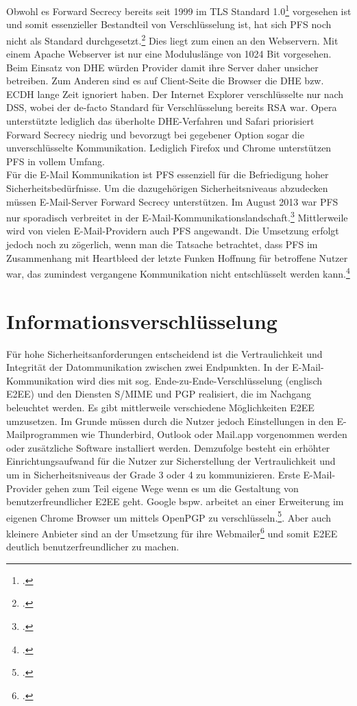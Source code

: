 \documentclass  [paper=a4,
				fontsize=12pt,
				listof=totoc,
				bibliography=totoc
				]{scrreprt}
\begin{document}
				Obwohl es Forward Secrecy bereits seit 1999 im \ac{TLS} Standard 1.0\footcite[Vgl.][]{Boeck2013} vorgesehen ist und somit essenzieller Bestandteil von Verschlüsselung ist, hat sich \ac{PFS} noch nicht als Standard durchgesetzt.\footcite{SSLLabs} Dies liegt zum einen an den Webservern. Mit einem Apache Webserver ist nur eine Moduluslänge von 1024 Bit vorgesehen. Beim Einsatz von \ac{DHE} würden Provider damit ihre Server daher unsicher betreiben. Zum Anderen sind es auf Client-Seite die Browser die \ac{DHE} bzw. \ac{ECDH} lange Zeit ignoriert haben. Der Internet Explorer verschlüsselte nur nach DSS, wobei der de-facto Standard für Verschlüsselung bereits \ac{RSA} war. Opera unterstützte lediglich das überholte \ac{DHE}-Verfahren und Safari priorisiert Forward Secrecy niedrig und bevorzugt bei gegebener Option sogar die unverschlüsselte Kommunikation. Lediglich Firefox und Chrome unterstützen \ac{PFS} in vollem Umfang.\medskip\\
				Für die E-Mail Kommunikation ist \ac{PFS} essenziell für die Befriedigung hoher Sicherheitsbedürfnisse. Um die dazugehörigen Sicherheitsniveaus abzudecken müssen E-Mail-Server Forward Secrecy unterstützen. Im August 2013 war \ac{PFS} nur sporadisch verbreitet in der E-Mail-Kommunikationslandschaft.\footcite[Vgl. ][]{Schulz2014} Mittlerweile wird von vielen E-Mail-Providern auch \ac{PFS} angewandt. Die Umsetzung erfolgt jedoch noch zu zögerlich, wenn man die Tatsache betrachtet, dass \ac{PFS} im Zusammenhang mit Heartbleed der letzte Funken Hoffnung für betroffene Nutzer war, das zumindest vergangene Kommunikation nicht entschlüsselt werden kann.\footcite[Vgl.][]{Zhu2014}
		
		\section{Informationsverschlüsselung}
			Für hohe Sicherheitsanforderungen entscheidend ist die Vertraulichkeit und Integrität der Datommunikation zwischen zwei Endpunkten. In der E-Mail-Kommunikation wird dies mit sog. Ende-zu-Ende-Verschlüsselung (englisch \ac{E2EE}) und den Diensten S/MIME und \ac{PGP} realisiert, die im Nachgang beleuchtet werden.
			Es gibt mittlerweile verschiedene Möglichkeiten \ac{E2EE} umzusetzen. Im Grunde müssen durch die Nutzer jedoch Einstellungen in den E-Mailprogrammen wie Thunderbird, Outlook oder Mail.app vorgenommen werden oder zusätzliche Software installiert werden. Demzufolge besteht ein erhöhter Einrichtungsaufwand für die Nutzer zur Sicherstellung der Vertraulichkeit und um in Sicherheitsniveaus der Grade 3 oder 4 zu kommunizieren.\medskip
			Erste E-Mail-Provider gehen zum Teil eigene Wege wenn es um die Gestaltung von benutzerfreundlicher \ac{E2EE} geht. Google bspw. arbeitet an einer Erweiterung im eigenen Chrome Browser um mittels OpenPGP zu verschlüsseln.\footcite[Vgl.][]{Somogyi2013}. Aber auch kleinere Anbieter sind an der Umsetzung für ihre Webmailer\footcite[Vgl.][]{Posteo2013} und somit \ac{E2EE} deutlich benutzerfreundlicher zu machen. 
			
\end{document}
